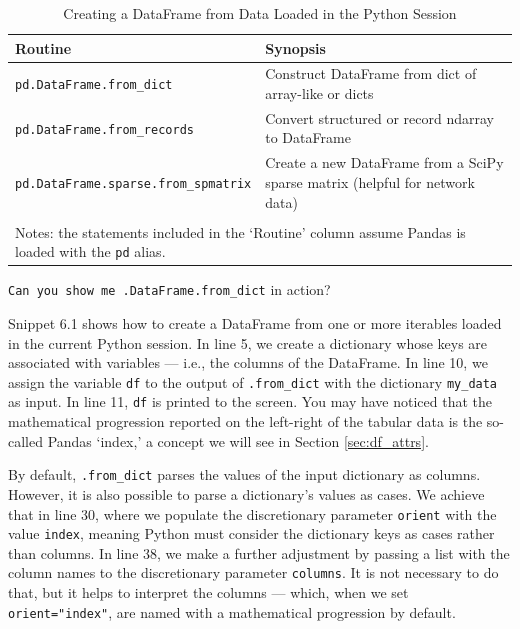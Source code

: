 \documentclass[a4paper,11pt]{book}
\newcommand{\question}[1]{%
    \begin{tcolorbox}[colback=comp_c!10,colframe=comp_c,sidebyside align=top,width=\linewidth,before skip=1ex]
        #1
    \end{tcolorbox}
    \switchcolumn%
}
\newcommand{\note}[1]{%
    \begin{tcolorbox}[colback=white!0,colframe=white!10,width=\linewidth,before skip=1ex]
        #1
    \end{tcolorbox}
}
\begin{document}
\begin{table}
	\centering
	\caption{Creating a DataFrame from Data Loaded in the Python Session}
	\label{tab:read_methods}
	\begin{tabular}{ll}
		\toprule \toprule 
		Routine & Synopsis \\
		\midrule 
		\texttt{pd.DataFrame.from\_dict} & Construct DataFrame from dict of array-like or dicts\\ 
		\texttt{pd.DataFrame.from\_records} & Convert structured or record ndarray to DataFrame\\
		\texttt{pd.DataFrame.sparse.from\_spmatrix} & Create a new DataFrame from a SciPy sparse matrix (helpful for network data)\\ 
		\bottomrule \\[-1.8ex]
		\multicolumn{2}{l}{Notes: the statements included in the `Routine' column assume Pandas is loaded with the \texttt{pd} alias.} \\
	\end{tabular}
\end{table}
\clearpage

\begin{paracol}{2}
	\question{\raggedright \texttt{Can you show me .DataFrame.from\_dict} in action?}
	\note{
		Snippet 6.1 shows how to create a DataFrame from one or more iterables loaded in the current Python session. In line 5, we create a dictionary whose keys are associated with variables --- i.e., the columns of the DataFrame. In line 10, we assign the variable \texttt{df} to the output of \texttt{.from\_dict} with the dictionary \texttt{my\_data} as input. In line 11, \texttt{df} is printed to the screen. You may have noticed that the mathematical progression reported on the left-right of the tabular data is the so-called Pandas `index,' a concept we will see in Section \ref{sec:df_attrs}.
	
		\quad By default, \texttt{.from\_dict} parses the values of the input dictionary as columns. However, it is also possible to parse a dictionary's values as cases. We achieve that in line 30, where we populate the discretionary parameter \texttt{orient} with the value \texttt{index}, meaning Python must consider the dictionary keys as cases rather than columns. In line 38, we make a further adjustment by passing a list with the column names to the discretionary parameter \texttt{columns}. It is not necessary to do that, but it helps to interpret the columns --- which, when we set \texttt{orient="index"}, are named with a mathematical progression by default.
	}
\end{paracol}
\end{document}

